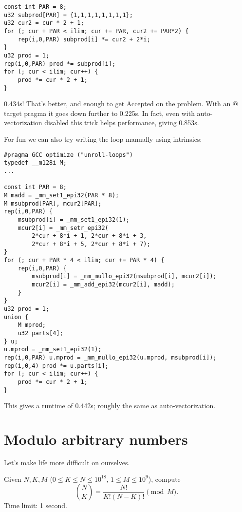 \documentclass[openany]{book}
\begin{document}
\begin{lstlisting}
const int PAR = 8;
u32 subprod[PAR] = {1,1,1,1,1,1,1,1};
u32 cur2 = cur * 2 + 1;
for (; cur + PAR < ilim; cur += PAR, cur2 += PAR*2) {
	rep(i,0,PAR) subprod[i] *= cur2 + 2*i;
}
u32 prod = 1;
rep(i,0,PAR) prod *= subprod[i];
for (; cur < ilim; cur++) {
	prod *= cur * 2 + 1;
}
\end{lstlisting}

0.434s! That's better, and enough to get Accepted on the problem.
With an @ target pragma it goes down further to 0.225s.
In fact, even with auto-vectorization disabled this trick helps performance, giving 0.853s.

For fun we can also try writing the loop manually using intrinsics:
\begin{lstlisting}
#pragma GCC optimize ("unroll-loops")
typedef __m128i M;
...

const int PAR = 8;
M madd = _mm_set1_epi32(PAR * 8);
M msubprod[PAR], mcur2[PAR];
rep(i,0,PAR) {
	msubprod[i] = _mm_set1_epi32(1);
	mcur2[i] = _mm_setr_epi32(
	    2*cur + 8*i + 1, 2*cur + 8*i + 3,
	    2*cur + 8*i + 5, 2*cur + 8*i + 7);
}
for (; cur + PAR * 4 < ilim; cur += PAR * 4) {
	rep(i,0,PAR) {
		msubprod[i] = _mm_mullo_epi32(msubprod[i], mcur2[i]);
		mcur2[i] = _mm_add_epi32(mcur2[i], madd);
	}
}
u32 prod = 1;
union {
	M mprod;
	u32 parts[4];
} u;
u.mprod = _mm_set1_epi32(1);
rep(i,0,PAR) u.mprod = _mm_mullo_epi32(u.mprod, msubprod[i]);
rep(i,0,4) prod *= u.parts[i];
for (; cur < ilim; cur++) {
	prod *= cur * 2 + 1;
}
\end{lstlisting}

This gives a runtime of 0.442s; roughly the same as auto-vectorization.

\section{Modulo arbitrary numbers}

Let's make life more difficult on ourselves.

\begin{framed}
\noindent
Given $N, K, M$ ($0 \le K \le N \le 10^{18}$, $1 \le M \le 10^9$), compute
\[
\binom N K = \frac{N!}{K!(N-K)!} \pmod {M}.
\]
Time limit: 1 second.
\end{framed}
\end{document}

